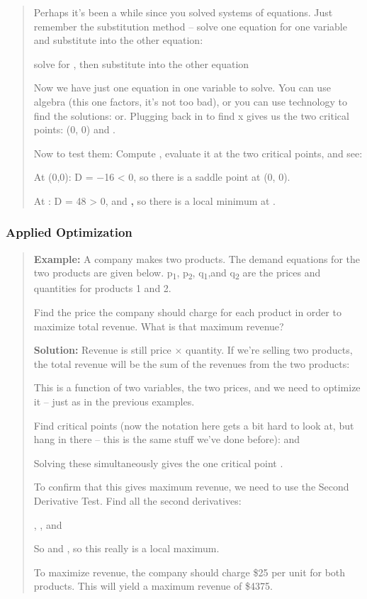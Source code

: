 \begin{quote}
Perhaps it's been a while since you solved systems of equations. Just
remember the substitution method -- solve one equation for one variable
and substitute into the other equation:

solve for , then substitute into the other equation

Now we have just one equation in one variable to solve. You can use
algebra (this one factors, it's not too bad), or you can use technology
to find the solutions: or. Plugging back in to find x gives us the two
critical points: (0, 0) and .

Now to test them: Compute , evaluate it at the two critical points, and
see:

At (0,0): D = −16 \textless{} 0, so there is a saddle point at (0, 0).

At : D = 48 \textgreater{} 0, and \textbf{,} so there is a local minimum
at .
\end{quote}

\subsubsection{Applied Optimization}\label{applied-optimization}

\begin{quote}
\textbf{Example:} A company makes two products. The demand equations for
the two products are given below. p\textsubscript{1},
p\textsubscript{2}, q\textsubscript{1},and q\textsubscript{2} are the
prices and quantities for products 1 and 2.

Find the price the company should charge for each product in order to
maximize total revenue. What is that maximum revenue?

\textbf{Solution:} Revenue is still price × quantity. If we're selling
two products, the total revenue will be the sum of the revenues from the
two products:

This is a function of two variables, the two prices, and we need to
optimize it -- just as in the previous examples.

Find critical points (now the notation here gets a bit hard to look at,
but hang in there -- this is the same stuff we've done before): and

Solving these simultaneously gives the one critical point .

To confirm that this gives maximum revenue, we need to use the Second
Derivative Test. Find all the second derivatives:

, , and

So and , so this really is a local maximum.

To maximize revenue, the company should charge \$25 per unit for both
products. This will yield a maximum revenue of \$4375.
\end{quote}


